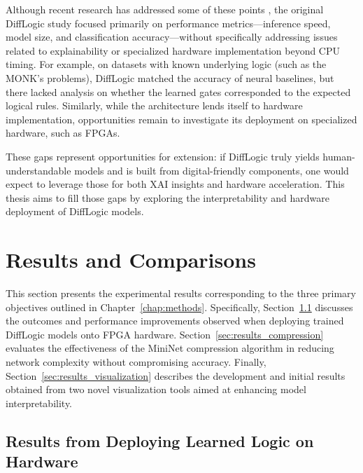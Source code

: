 Although recent research has addressed some of these points \cite{explogic}, the original DiffLogic study focused primarily on performance metrics---inference speed, model size, and classification accuracy---without specifically addressing issues related to explainability or specialized hardware implementation beyond CPU timing. For example, on datasets with known underlying logic (such as the MONK’s problems), DiffLogic matched the accuracy of neural baselines, but there lacked analysis on whether the learned gates corresponded to the expected logical rules. Similarly, while the architecture lends itself to hardware implementation, opportunities remain to investigate its deployment on specialized hardware, such as FPGAs.

These gaps represent opportunities for extension: if DiffLogic truly yields human-understandable models and is built from digital-friendly components, one would expect to leverage those for both XAI insights and hardware acceleration. This thesis aims to fill those gaps by exploring the interpretability and hardware deployment of DiffLogic models.








\chapter{Results and Comparisons}
\label{chap:results}


This section presents the experimental results corresponding to the three primary objectives outlined in Chapter~\ref{chap:methods}. Specifically, Section~\ref{sec:results_fpga} discusses the outcomes and performance improvements observed when deploying trained DiffLogic models onto FPGA hardware. Section~\ref{sec:results_compression} evaluates the effectiveness of the MiniNet compression algorithm in reducing network complexity without compromising accuracy. Finally, Section~\ref{sec:results_visualization} describes the development and initial results obtained from two novel visualization tools aimed at enhancing model interpretability.

\section{Results from Deploying Learned Logic on Hardware}
\label{sec:results_fpga}



